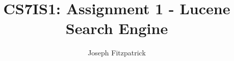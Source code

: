 \documentclass[acmtog, authorversion]{acmart}
\begin{document}
\title{CS7IS1: Assignment 1 - Lucene Search Engine}

\author{Joseph Fitzpatrick}



\maketitle


\end{document}
